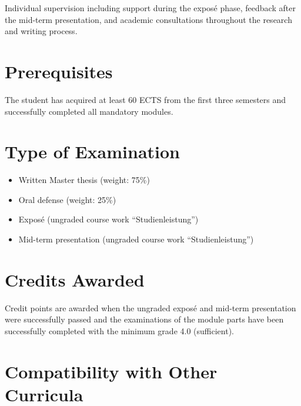 \documentclass[
  letterpaper,
  10pt,
  openany]{book}
\providecommand{\tightlist}{%
  \setlength{\itemsep}{0pt}\setlength{\parskip}{0pt}}\usepackage{longtable,booktabs,array}
\begin{document}

Individual supervision including support during the exposé phase,
feedback after the mid-term presentation, and academic consultations
throughout the research and writing process.

\section*{Prerequisites}\label{prerequisites-7}


The student has acquired at least 60 ECTS from the first three semesters
and successfully completed all mandatory modules.

\section*{Type of Examination}\label{type-of-examination-7}


\begin{itemize}
\tightlist
\item
  Written Master thesis (weight: 75\%)\\
\item
  Oral defense (weight: 25\%)\\
\item
  Exposé (ungraded course work ``Studienleistung'')\\
\item
  Mid-term presentation (ungraded course work ``Studienleistung'')
\end{itemize}

\section*{Credits Awarded}\label{credits-awarded-7}


Credit points are awarded when the ungraded exposé and mid-term
presentation were successfully passed and the examinations of the module
parts have been successfully completed with the minimum grade 4.0
(sufficient).

\section*{Compatibility with Other
Curricula}\label{compatibility-with-other-curricula-7}
\end{document}
